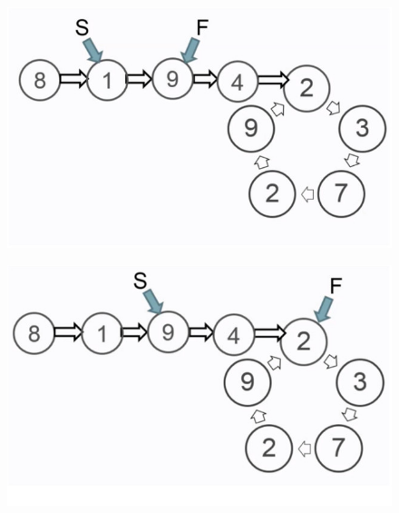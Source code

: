 \documentclass{beamer}
\begin{document}
\begin{frame}
  \begin{figure}
    \includegraphics[scale=0.3]{floyd_step2}
  \end{figure}
\end{frame}
\begin{frame}
  \begin{figure}
    \includegraphics[scale=0.3]{floyd_step3}
  \end{figure}
\end{frame}
\end{document}
